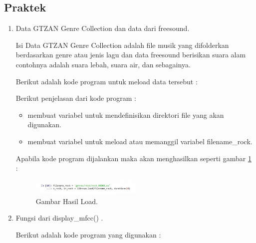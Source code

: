 \subsection{Praktek}
\begin{enumerate}
\item Data GTZAN Genre Collection dan data dari freesound. 
	\par Isi Data GTZAN Genre Collection adalah file musik yang difolderkan berdasarkan genre atau jenis lagu dan data freesound berisikan suara alam contohnya adalah suara lebah, suara air, dan sebagainya.
	\par Berikut adalah kode program untuk meload data tersebut :
	
	\par Berikut penjelasan dari kode program :
	\begin{itemize}
	\item membuat variabel untuk mendefinisikan direktori file yang akan digunakan.
	\item membuat variabel untuk meload atau memanggil variabel filename\_rock.
	\end{itemize}
	
	\par Apabila kode program dijalankan maka akan menghasilkan seperti gambar \ref{no9} :
		\begin{figure}[ht]
		\centerline{\includegraphics[width=0.5\textwidth]{figures/chapter6/no9.jpg}}
		\caption{Gambar Hasil Load.}
		\label{no9}
		\end{figure}

\item Fungsi dari display\_mfcc() .
	\par Berikut adalah kode program yang digunakan :
	

\end{enumerate}
